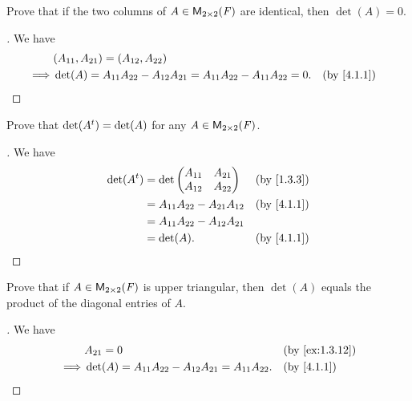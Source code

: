 \begin{ex}\label{ex:4.1.6}
  Prove that if the two columns of \(A \in \mathsf{M}_{{2} \times 2}({\mathit{F}})\) are identical, then \(\det(A) = 0\).
\end{ex}

\begin{proof}[]
  We have
  \begin{align*}
             & (A_{1 1}, A_{2 1}) = (A_{1 2}, A_{2 2})                                                                            \\
    \implies & \det(A) = A_{1 1} A_{2 2} - A_{1 2} A_{2 1} = A_{1 1} A_{2 2} - A_{1 1} A_{2 2} = 0. &  & \text{(by \cref{4.1.1})}
  \end{align*}
\end{proof}

\begin{ex}\label{ex:4.1.7}
  Prove that \(\det({A}^{t}) = \det(A)\) for any \(A \in \mathsf{M}_{{2} \times 2}({\mathit{F}})\).
\end{ex}

\begin{proof}[]
  We have
  \begin{align*}
    \det(\tp{A}) & = \det\begin{pmatrix}
                           A_{1 1} & A_{2 1} \\
                           A_{1 2} & A_{2 2}
                         \end{pmatrix}               &  & \text{(by \cref{1.3.3})}   \\
                 & = A_{1 1} A_{2 2} - A_{2 1} A_{1 2} &  & \text{(by \cref{4.1.1})} \\
                 & = A_{1 1} A_{2 2} - A_{1 2} A_{2 1}                               \\
                 & = \det(A).                          &  & \text{(by \cref{4.1.1})}
  \end{align*}
\end{proof}

\begin{ex}\label{ex:4.1.8}
  Prove that if \(A \in \mathsf{M}_{{2} \times 2}({\mathit{F}})\) is upper triangular, then \(\det(A)\) equals the product of the diagonal entries of \(A\).
\end{ex}

\begin{proof}[]
  We have
  \begin{align*}
             & A_{2 1} = 0                                                    &  & \text{(by \cref{ex:1.3.12})} \\
    \implies & \det(A) = A_{1 1} A_{2 2} - A_{1 2} A_{2 1} = A_{1 1} A_{2 2}. &  & \text{(by \cref{4.1.1})}
  \end{align*}
\end{proof}

